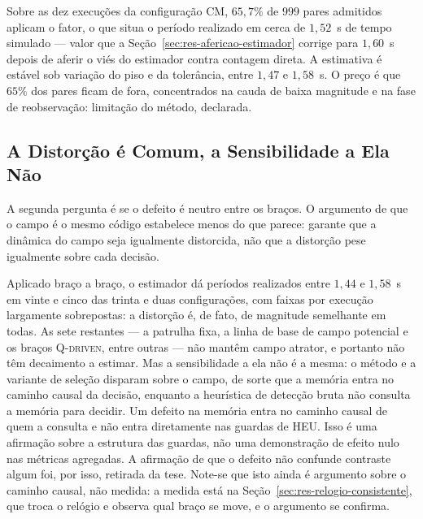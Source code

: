 Sobre as dez execuções da configuração CM, $65{,}7\%$ de $999$ pares admitidos
aplicam o fator, o que situa o período realizado em cerca de $1{,}52$~s de tempo
simulado --- valor que a Seção~\ref{sec:res-afericao-estimador} corrige para
$1{,}60$~s depois de aferir o viés do estimador contra contagem direta. A estimativa é estável sob variação do piso e da tolerância, entre $1{,}47$ e
$1{,}58$~s. O preço é que $65\%$ dos pares ficam de fora, concentrados na cauda de baixa
magnitude e na fase de reobservação: limitação do método, declarada.

\subsection{A Distorção é Comum, a Sensibilidade a Ela Não}

A segunda pergunta é se o defeito é neutro entre os braços. O argumento de que o campo é
o mesmo código estabelece menos do que parece: garante que a dinâmica do campo seja
igualmente distorcida, não que a distorção pese igualmente sobre cada decisão.

Aplicado braço a braço, o estimador dá períodos realizados entre $1{,}44$ e
$1{,}58$~s em vinte e cinco das trinta e duas configurações, com faixas por execução
largamente sobrepostas: a distorção é, de fato, de magnitude semelhante em todas. As
sete restantes --- a patrulha fixa, a linha de base de campo potencial e os braços
\textsc{Q-driven}, entre outras --- não mantêm campo atrator, e portanto não têm
decaimento a estimar. Mas a sensibilidade a ela não é a mesma: o
método e a variante de seleção disparam sobre o campo, de sorte que a memória entra no
caminho causal da decisão, enquanto a heurística de detecção bruta não consulta a
memória para decidir. Um defeito na memória entra no caminho causal de quem a consulta
e não entra diretamente nas guardas de HEU. Isso é uma afirmação sobre a estrutura das
guardas, não uma demonstração de efeito nulo nas métricas agregadas. A afirmação de que o defeito não confunde contraste algum foi, por isso,
retirada da tese. Note-se que isto ainda é argumento sobre o caminho causal, não medida:
a medida está na Seção~\ref{sec:res-relogio-consistente}, que troca o relógio e observa
qual braço se move, e o argumento se confirma.

